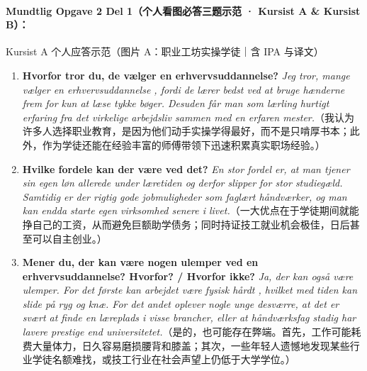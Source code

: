 \clearpage
\paragraph*{Mundtlig Opgave 2 Del 1（个人看图必答三题示范 · Kursist A \& Kursist B）：}

\begin{grammatikbox}{Kursist A 个人应答示范（图片 A：职业工坊实操学徒｜含 IPA 与译文）}
\small
\begin{enumerate}
  \item \textbf{Hvorfor tror du, de vælger en erhvervsuddannelse?} \textit{Jeg tror, mange vælger en erhvervsuddannelse , fordi de lærer bedst ved at bruge hænderne frem for kun at læse tykke bøger. Desuden får man som lærling hurtigt erfaring fra det virkelige arbejdsliv sammen med en erfaren mester.}（我认为许多人选择职业教育，是因为他们动手实操学得最好，而不是只啃厚书本；此外，作为学徒还能在经验丰富的师傅带领下迅速积累真实职场经验。）
  \item \textbf{Hvilke fordele kan der være ved det?} \textit{En stor fordel er, at man tjener sin egen løn allerede under læretiden  og derfor slipper for stor studiegæld. Samtidig er der rigtig gode jobmuligheder som faglært håndværker, og man kan endda starte egen virksomhed senere i livet.}（一大优点在于学徒期间就能挣自己的工资，从而避免巨额助学债务；同时持证技工就业机会极佳，日后甚至可以自主创业。）
  \item \textbf{Mener du, der kan være nogen ulemper ved en erhvervsuddannelse? Hvorfor? / Hvorfor ikke?} \textit{Ja, der kan også være ulemper. For det første kan arbejdet være fysisk hårdt , hvilket med tiden kan slide på ryg og knæ. For det andet oplever nogle unge desværre, at det er svært at finde en læreplads i visse brancher, eller at håndværksfag stadig har lavere prestige end universitetet.}（是的，也可能存在弊端。首先，工作可能耗费大量体力，日久容易磨损腰背和膝盖；其次，一些年轻人遗憾地发现某些行业学徒名额难找，或技工行业在社会声望上仍低于大学学位。）
\end{enumerate}
\end{grammatikbox}

